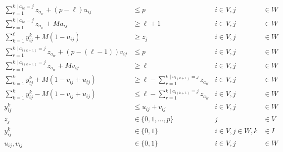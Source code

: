 {\small
  \begin{align}
    \sum_{r = 1}^{k \mid a_{ik}=j}{
      z_{a_{ir}}
    }
    + (p-\ell) u_{ij}
    & \leq p
    &  i \in V, j 
    & \in W
    \\
    \sum_{r = 1}^{k \mid a_{ik}=j}{
      z_{a_{ir}}
    }
    + M u_{ij}
    & \geq \ell+1
    & i \in V, j 
    & \in W
    \\
    \sum_{k = 1}^{\ell}{
      y_{ij}^{k}
    }
    + M (1 - u_{ij})
    & \geq z_j
    &  i \in V, j 
    & \in W
    \\
    \sum_{r = 1}^{k \mid a_{i(k+1)}=j}{
      z_{a_{ir}}
    }
    + (p-(\ell-1)) v_{ij}
    & \leq p
    &  i \in V, j
    & \in W
    \\
    \sum_{r = 1}^{k \mid a_{i(k+1)}=j}{
      z_{a_{ir}}
    }
    + M v_{ij}
    & \geq \ell
    &  i \in V, j 
    & \in W
    \\
    \sum_{k=1}^{k}{
      y_{ij}^{k}
    }
    + M (1 - v_{ij} + u_{ij})
    & \geq \ell
    - \sum_{r = 1}^{k \mid a_{i(k+1)}=j}{
      z_{a_{ir}}
    } 
    &  i \in V, j 
    & \in W
    \\
    \sum_{k=1}^{k}{
      y_{ij}^{k}
    }
    - M (1 - v_{ij} + u_{ij})
    & \leq \ell 
    - \sum_{r = 1}^{k \mid a_{i(k+1)}=j}{z_{a_{ir}}}
    &  i \in V, j 
    & \in W
    \\
    y_{ij}^{k}
    & \leq u_{ij}
    + v_{ij}
    & i \in V,j 
    & \in W
    \\
    z_j
    & \in \{0,1,\ldots,p\}
    & j
    & \in V \nonumber
    \\
    y_{ij}^{k} 
    & \in \{0,1\}
    & i\in V,j\in W,k
    & \in I \nonumber
    \\
    u_{ij},v_{ij}
    & \in \{0,1\}
    & i \in V,j
    & \in W \nonumber
  \end{align}
}
